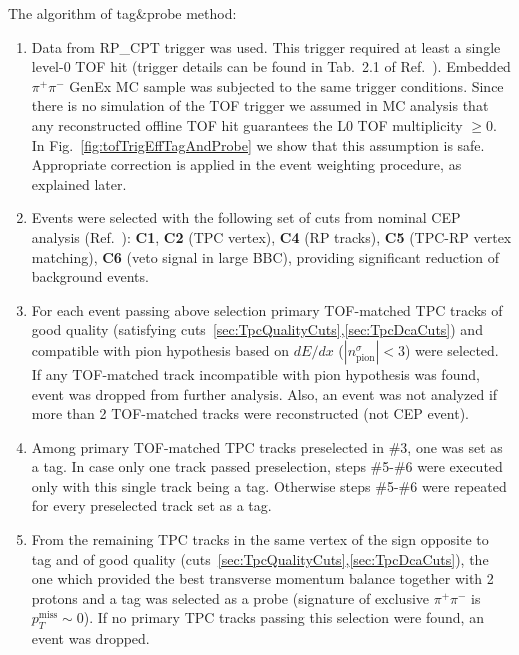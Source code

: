 
The algorithm of tag\&probe method:
\begin{enumerate}
 \item Data from RP\_CPT trigger was used. This trigger required at least a single level-0 TOF hit (trigger details can be found in Tab.~2.1 of Ref.~\cite{AnalysisNoteRafal}). Embedded $\pi^{+}\pi^{-}$ GenEx MC sample was subjected to the same trigger conditions. Since there is no simulation of the TOF trigger we assumed in MC analysis that any reconstructed offline TOF hit guarantees the L0 TOF multiplicity $\geq0$. In Fig.~\ref{fig:tofTrigEffTagAndProbe} we show that this assumption is safe. Appropriate correction is applied in the event weighting procedure, as explained later.\\[-16pt]%
 \item Events were selected with the following set of cuts from nominal CEP analysis (Ref.~\cite{AnalysisNoteRafal}): \textbf{C1}, \textbf{C2} (TPC vertex), \textbf{C4} (RP tracks), \textbf{C5} (TPC-RP vertex matching), \textbf{C6} (veto signal in large BBC), providing significant reduction of background events.\\[-16pt]
 \item For each event passing above selection primary TOF-matched TPC tracks of good quality (satisfying cuts~\ref{sec:TpcQualityCuts},\ref{sec:TpcDcaCuts}) and compatible with pion hypothesis based on $dE/dx$ ($|n^{\sigma}_{\text{pion}}|<3$) were selected. If any TOF-matched track incompatible with pion hypothesis was found, event was dropped from further analysis. Also, an event was not analyzed if more than 2 TOF-matched tracks were reconstructed (not CEP event).\\[-16pt]
 \item Among primary TOF-matched TPC tracks preselected in \#3, one was set as a tag. In case only one track passed preselection, steps \#5-\#6 were executed only with this single track being a tag. Otherwise steps \#5-\#6 were repeated for every preselected track set as a tag.\\[-16pt]
 \item From the remaining TPC tracks in the same vertex of the sign opposite to tag and of good quality (cuts~\ref{sec:TpcQualityCuts},\ref{sec:TpcDcaCuts}), the one which provided the best transverse momentum balance together with 2 protons and a tag was selected as a probe (signature of exclusive $\pi^{+}\pi^{-}$ is  $p_{T}^{\text{miss}}\sim0$). If no primary TPC tracks passing this selection were found, an event was dropped.\\[-16pt]

\end{enumerate}

